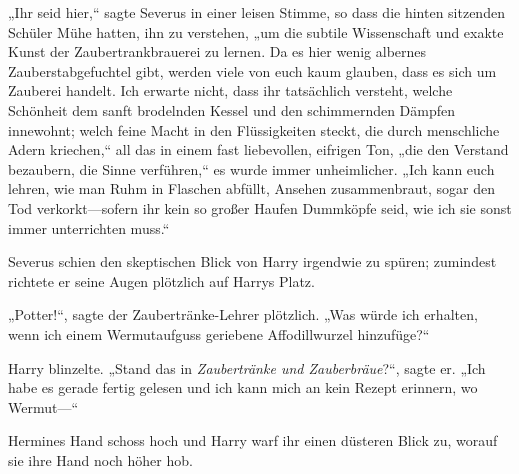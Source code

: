 „Ihr seid hier,“ sagte Severus in einer leisen Stimme, so dass die hinten sitzenden Schüler Mühe hatten, ihn zu verstehen, „um die subtile Wissenschaft und exakte Kunst der Zaubertrankbrauerei zu lernen. Da es hier wenig albernes Zauberstabgefuchtel gibt, werden viele von euch kaum glauben, dass es sich um Zauberei handelt. Ich erwarte nicht, dass ihr tatsächlich versteht, welche Schönheit dem sanft brodelnden Kessel und den schimmernden Dämpfen innewohnt; welch feine Macht in den Flüssigkeiten steckt, die durch menschliche Adern kriechen,“ all das in einem fast liebevollen, eifrigen Ton, „die den Verstand bezaubern, die Sinne verführen,“ es wurde immer unheimlicher. „Ich kann euch lehren, wie man Ruhm in Flaschen abfüllt, Ansehen zusammenbraut, sogar den Tod verkorkt—sofern ihr kein so großer Haufen Dummköpfe seid, wie ich sie sonst immer unterrichten muss.“

Severus schien den skeptischen Blick von Harry irgendwie zu spüren; zumindest richtete er seine Augen plötzlich auf Harrys Platz.

„Potter!“, sagte der Zaubertränke-Lehrer plötzlich. „Was würde ich erhalten, wenn ich einem Wermutaufguss geriebene Affodillwurzel hinzufüge?“

Harry blinzelte. „Stand das in \emph{Zaubertränke und Zauberbräue}?“, sagte er. „Ich habe es gerade fertig gelesen und ich kann mich an kein Rezept erinnern, wo Wermut—“

Hermines Hand schoss hoch und Harry warf ihr einen düsteren Blick zu, worauf sie ihre Hand noch höher hob.

